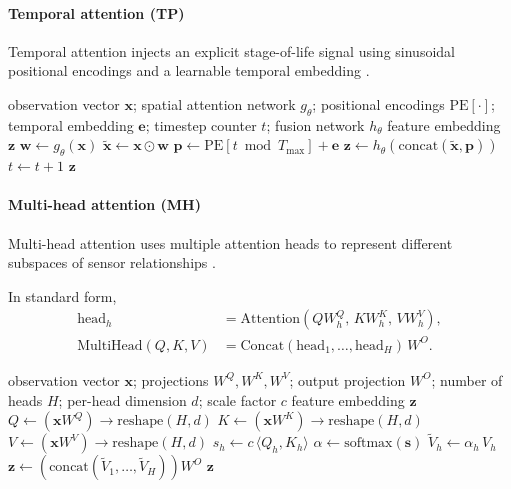 \documentclass[sn-basic]{sn-jnl} %
\begin{document}
\paragraph{Temporal attention (TP)}
Temporal attention injects an explicit stage-of-life signal using sinusoidal positional encodings and a learnable temporal embedding \cite{Vaswani2017}.

\begin{algorithm}[t]
\caption{Temporal attention feature extractor (forward pass)}
\label{alg:tp_forward}
\begin{algorithmic}[1]
\Require observation vector $\mathbf{x}$; spatial attention network $g_\theta$; positional encodings $\mathrm{PE}[\cdot]$; temporal embedding $\mathbf{e}$; timestep counter $t$; fusion network $h_\theta$
\Ensure feature embedding $\mathbf{z}$
\State $\mathbf{w} \gets g_\theta(\mathbf{x})$ 
\State $\tilde{\mathbf{x}} \gets \mathbf{x} \odot \mathbf{w}$
\State $\mathbf{p} \gets \mathrm{PE}[t \bmod T_{\max}] + \mathbf{e}$
\State $\mathbf{z} \gets h_\theta(\mathrm{concat}(\tilde{\mathbf{x}},\mathbf{p}))$
\State $t \gets t+1$
\State \Return $\mathbf{z}$
\end{algorithmic}
\end{algorithm}

\paragraph{Multi-head attention (MH)}
Multi-head attention uses multiple attention heads to represent different subspaces of sensor relationships \cite{Vaswani2017}.

In standard form,
\begin{align}
\mathrm{head}_h &= \mathrm{Attention}(QW_h^Q,\,KW_h^K,\,VW_h^V),\\
\mathrm{MultiHead}(Q,K,V) &= \mathrm{Concat}(\mathrm{head}_1,\ldots,\mathrm{head}_H)\,W^O.
\end{align}

\begin{algorithm}[t]
\caption{Multi-head attention feature extractor (forward pass; head-gating over $H$ heads)}
\label{alg:mh_forward}
\begin{algorithmic}[1]
\Require observation vector $\mathbf{x}$; projections $W^Q,W^K,W^V$; output projection $W^O$; number of heads $H$; per-head dimension $d$; scale factor $c$
\Ensure feature embedding $\mathbf{z}$
\State $Q \gets (\mathbf{x}W^Q) \rightarrow \text{reshape}(H, d)$
\State $K \gets (\mathbf{x}W^K) \rightarrow \text{reshape}(H, d)$
\State $V \gets (\mathbf{x}W^V) \rightarrow \text{reshape}(H, d)$
        \State $s_h \gets c\,\langle Q_h, K_h\rangle$
\EndFor
\State $\alpha \gets \mathrm{softmax}(\mathbf{s})$ 
        \State $\tilde{V}_h \gets \alpha_h\,V_h$
\EndFor
\State $\mathbf{z} \gets (\mathrm{concat}(\tilde{V}_1,\ldots,\tilde{V}_H))W^O$
\State \Return $\mathbf{z}$
\end{algorithmic}
\end{algorithm}
\end{document}

